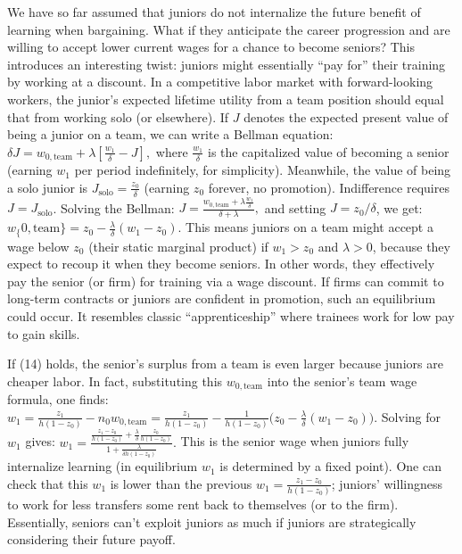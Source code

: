 \documentclass[12pt]{article}
\begin{document}
We have so far assumed that juniors {do not internalize} the future
benefit of learning when bargaining. What if they {anticipate the
career progression} and are willing to accept lower current wages for a
chance to become seniors? This introduces an interesting twist: juniors
might essentially ``pay for'' their training by working at a discount.
In a competitive labor market with forward-looking workers, the junior's
expected lifetime utility from a team position should equal that from
working solo (or elsewhere). If \(J\) denotes the expected {present
value} of being a junior on a team, we can write a {Bellman
equation}:
\(\delta J = w_{0,\text{team}} + \lambda [\frac{w_1}{\delta} - J],\)
where \(\frac{w_1}{\delta}\) is the capitalized value of becoming a
senior (earning \(w_1\) per period indefinitely, for simplicity).
Meanwhile, the value of being a solo junior is
\(J_{\text{solo}} = \frac{z_0}{\delta}\) (earning \(z_0\) forever, no
promotion). Indifference requires \(J = J_{\text{solo}}\). Solving the
Bellman:
\(J = \frac{w_{0,\text{team}} + \lambda \frac{w_1}{\delta}}{\delta + \lambda},\)
and setting \(J = z_0/\delta\), we get: $ w_\{0,\text{team}\} = z_0 -
\frac{\lambda}{\delta}(w_1 - z_0). \tag{14}$ This means juniors on a
team might accept a wage {below} \(z_0\) (their static marginal
product) if \(w_1 > z_0\) and \(\lambda>0\), because they expect to
recoup it when they become seniors. In other words, they effectively pay
the senior (or firm) for training via a wage discount. If firms can
commit to long-term contracts or juniors are confident in promotion,
such an equilibrium could occur. It resembles classic ``apprenticeship''
where trainees work for low pay to gain skills.

If (14) holds, the senior's surplus from a team is even larger because
juniors are cheaper labor. In fact, substituting this
\(w_{0,\text{team}}\) into the senior's team wage formula, one finds:
\(w_1 = \frac{z_1}{h(1-z_0)} - n_0 w_{0,\text{team}} = \frac{z_1}{h(1-z_0)} - \frac{1}{h(1-z_0)}\Big(z_0 - \frac{\lambda}{\delta}(w_1 - z_0)\Big).\)
Solving for \(w_1\) gives: $ w_1 =
\frac{\frac{z_1 - z_0}{h(1-z_0)} + \frac{\lambda}{\delta}\frac{z_0}{h(1-z_0)}}{1 + \frac{\lambda}{\delta h(1-z_0)}}.
\tag{15}$ This is the senior wage when juniors fully internalize
learning (in equilibrium \(w_1\) is determined by a fixed point). One
can check that this \(w_1\) is lower than the previous
\(w_1 = \frac{z_1 - z_0}{h(1-z_0)}\); juniors' willingness to work for
less transfers some rent back to themselves (or to the firm).
Essentially, seniors can't exploit juniors as much if juniors are
strategically considering their future payoff.
\end{document}
